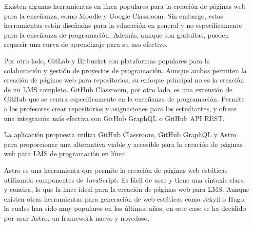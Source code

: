 


Existen algunas herramientas en línea populares para la creación de páginas web para la enseñanza, como Moodle y Google Classroom. Sin embargo, estas herramientas están diseñadas para la educación en general y no específicamente para la enseñanza de programación. Además, aunque son gratuitas, pueden requerir una curva de aprendizaje para su uso efectivo.

Por otro lado, GitLab y Bitbucket son plataformas populares para la colaboración y gestión de proyectos de programación. Aunque ambos permiten la creación de páginas web para repositorios, su enfoque principal no es la creación de un LMS completo. GitHub Classroom, por otro lado, es una extensión de GitHub que se centra específicamente en la enseñanza de programación. Permite a los profesores crear repositorios y asignaciones para los estudiantes, y ofrece una integración más efectiva con GitHub GraphQL o GitHub API REST.

La aplicación propuesta utiliza GitHub Classroom, GitHub GraphQL y Astro para proporcionar una alternativa viable y accesible para la creación de páginas web para LMS de programación en línea.

Astro es una herramienta que permite la creación de páginas web estáticas utilizando componentes de JavaScript. Es fácil de usar y tiene una sintaxis clara y concisa, lo que la hace ideal para la creación de páginas web para LMS. Aunque existen otras herramientas para generación de web estáticas como Jekyll o Hugo, la cuales han sido muy populares en los últimos años, en este caso se ha decidido por usar Astro, un framework\cite{framework} nuevo y novedoso.


